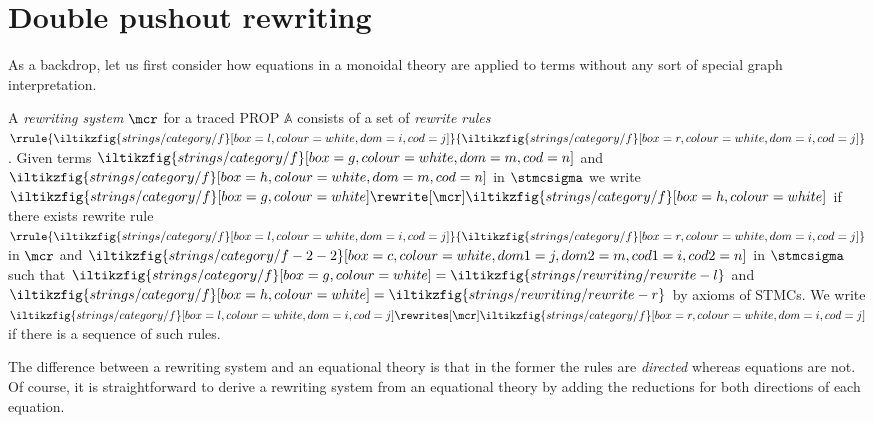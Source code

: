 \section{Double pushout rewriting}

As a backdrop, let us first consider how equations in a monoidal theory are
applied to terms without any sort of special graph interpretation.

\begin{definition}\label{def:term-rewriting}
    A \emph{rewriting system} \(\mcr\) for a traced PROP \(\mathbb{A}\)
    consists of a set of \emph{rewrite rules} \(
    \rrule{
        \iltikzfig{strings/category/f}[box=l,colour=white,dom=i,cod=j]
    }{
        \iltikzfig{strings/category/f}[box=r,colour=white,dom=i,cod=j]
    }
    \).
    Given terms \(
    \iltikzfig{strings/category/f}[box=g,colour=white,dom=m,cod=n]
    \) and \(
    \iltikzfig{strings/category/f}[box=h,colour=white,dom=m,cod=n]
    \) in \(\stmcsigma\) we write \(
    \iltikzfig{strings/category/f}[box=g,colour=white]
    \rewrite[\mcr]
    \iltikzfig{strings/category/f}[box=h,colour=white]
    \) if there exists rewrite rule \(\rrule{
        \iltikzfig{strings/category/f}[box=l,colour=white,dom=i,cod=j]
    }{
        \iltikzfig{strings/category/f}[box=r,colour=white,dom=i,cod=j]
    }\) in \(\mcr\) and \(
    \iltikzfig{strings/category/f-2-2}[box=c,colour=white,dom1=j,dom2=m,cod1=i,cod2=n]
    \) in \(\stmcsigma\) such that \(
    \iltikzfig{strings/category/f}[box=g,colour=white]
    =
    \iltikzfig{strings/rewriting/rewrite-l}
    \) and \(
    \iltikzfig{strings/category/f}[box=h,colour=white]
    =
    \iltikzfig{strings/rewriting/rewrite-r}
    \) by axioms of STMCs.
    We write \(
    \iltikzfig{strings/category/f}[box=l,colour=white,dom=i,cod=j]
    \rewrites[\mcr]
    \iltikzfig{strings/category/f}[box=r,colour=white,dom=i,cod=j]
    \) if there is a sequence of such rules.
\end{definition}

The difference between a rewriting system and an equational theory is that in
the former the rules are \emph{directed} whereas equations are not.
Of course, it is straightforward to derive a rewriting system from an equational
theory by adding the reductions for both directions of each equation.

